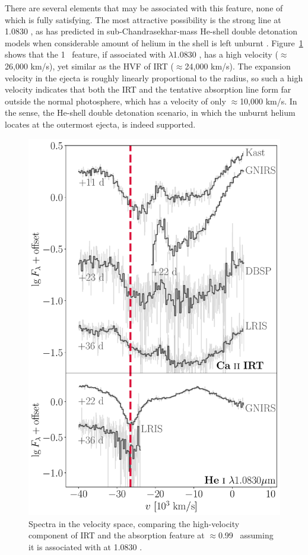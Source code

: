 \documentclass[twocolumn]{aastex631}
\begin{document}
There are several elements that may be associated with this feature, none of which is fully satisfying. The most attractive possibility is the strong  line at 1.0830 \micron, as has predicted in sub-Chandrasekhar-mass He-shell double detonation models when considerable amount of helium in the shell is left unburnt \citep{Boyle2017_Helium}. Figure~\ref{fig:hvf_comp} shows that the 1 \micron\ feature, if associated with  $\lambda$1.0830 \micron, has a high velocity ($\approx$26,000 km/s), yet similar as the HVF of  IRT ($\approx$24,000 km/s). The expansion velocity in the ejecta is roughly linearly proportional to the radius, so such a high velocity indicates that both the  IRT and the tentative  absorption line form far outside the normal photosphere, which has a velocity of only $\approx$10,000 km/s. In the sense, the He-shell double detonation scenario, in which the unburnt helium locates at the outermost ejecta, is indeed supported.
\begin{figure}
    \centering
    \includegraphics[width=\linewidth]{CaII_HeI_hvf.pdf}
    \caption{Spectra in the velocity space, comparing the high-velocity component of  IRT and the absorption feature at $\approx$0.99 \micron\ assuming it is associated with  at 1.0830 \micron.}
    \label{fig:hvf_comp}
\end{figure}
\end{document}
